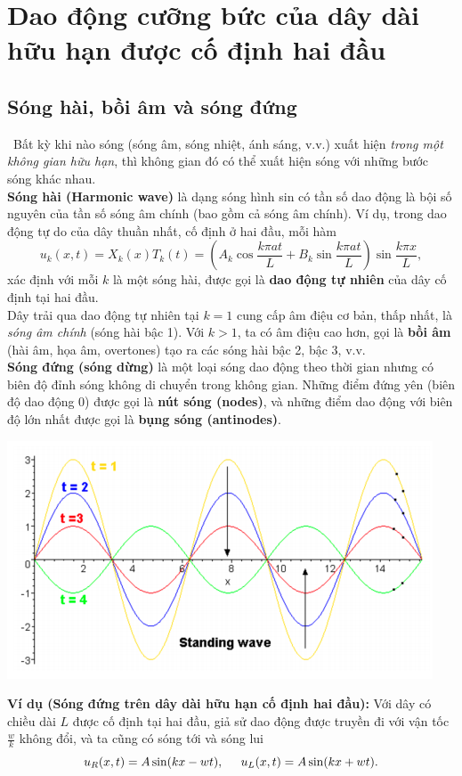 \documentclass[10pt, a4paper]{article}
\begin{document}
	\section{Dao động cưỡng bức của dây dài hữu hạn được cố định hai đầu}
	\subsection{Sóng hài, bồi âm và sóng đứng}
	\vspace{1mm}
	\quad\,\,\,Bất kỳ khi nào sóng (sóng âm, sóng nhiệt, ánh sáng, v.v.) xuất hiện \textit{trong một không gian hữu hạn}, thì không gian đó có thể xuất hiện sóng với những bước sóng khác nhau.\\
	
	\textbf{\color{red}Sóng hài (Harmonic wave)} là dạng sóng hình sin có tần số dao động là bội số nguyên của tần số sóng âm chính (bao gồm cả sóng âm chính). Ví dụ, trong dao động tự do của dây thuần nhất, cố định ở hai đầu, mỗi hàm $$u_k(x,t)=X_k(x)T_k(t)=\left(A_k\cos\dfrac{k\pi at}{L}+B_k\sin\dfrac{k\pi at}{L}\right)\sin\dfrac{k\pi x}{L},$$
	xác định với mỗi $k$ là một sóng hài, được gọi là \textbf{\color{red}dao động tự nhiên} của dây cố định tại hai đầu.\\
	
	Dây trải qua dao động tự nhiên tại $k = 1$ cung cấp âm điệu cơ bản, thấp nhất, là \textit{sóng âm chính} (sóng hài bậc 1). Với $k > 1$, ta có âm điệu cao hơn, gọi là \textbf{\color{red}bồi âm} (hài âm, họa âm, overtones) tạo ra các sóng hài bậc 2, bậc 3, v.v.\\
	
	\textbf{\color{red}Sóng đứng (sóng dừng)} là một loại sóng dao động theo thời gian nhưng có biên độ đỉnh sóng không di chuyển trong không gian. Những điểm đứng yên (biên độ dao động 0) được gọi là \textbf{\color{red}nút
		sóng (nodes)}, và những điểm dao động với biên độ lớn nhất được gọi là \textbf{\color{red}bụng sóng (antinodes)}.
	\begin{center}
		\includegraphics[width=0.5\linewidth]{standWave.png}
	\end{center}
	
	\textbf{Ví dụ (Sóng đứng trên dây dài hữu hạn cố định hai đầu):} Với dây có chiều dài $L$ được cố định tại hai đầu, giả sử dao động được truyền đi với vận tốc $\frac wk$ không đổi, và ta cũng có sóng tới và sóng lui $$u_R(x,t)=A\sin(kx-wt),\hspace{0.5cm}u_L(x,t)=A\sin(kx+wt).$$
	
\end{document}

